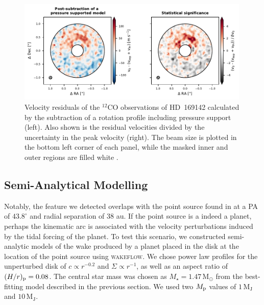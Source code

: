 \begin{figure}
    \centering
    \includegraphics[width = 0.99\textwidth]{figures/garg_arc.pdf}
    \caption{Velocity residuals of the $^{12}$CO observations of HD~169142 calculated by the subtraction of a rotation profile including pressure support (left). Also shown is the residual velocities divided by the uncertainty in the peak velocity (right). The beam size is plotted in the bottom left corner of each panel, while the masked inner and outer regions are filled white \citep{garg2022}.}
    \label{fig:garg_arc}
\end{figure}

\subsection{Semi-Analytical Modelling}

Notably, the feature we detected overlaps with the point source found in \citet{gratton2019} at a PA of $43.8^\circ$ and radial separation of $38$ au.
If the point source is a indeed a planet, perhaps the kinematic arc is associated with the velocity perturbations induced by the tidal forcing of the planet.
To test this scenario, we constructed semi-analytic models of the wake produced by a planet placed in the disk at the location of the \citet{gratton2019} point source using \textsc{wakeflow}.
We chose power law profiles for the unperturbed disk of $c \propto r^{-0.2}$ and $\Sigma \propto r^{-1}$, as well as an aspect ratio of $(H/r)_{\rm p}=0.08$.
The central star mass was chosen as $M_\star = 1.47 \, \mathrm{M_\odot}$ from the best-fitting model described in the previous section.
We used two $M_{\rm p}$ values of $1 \, \mathrm{M_J}$ and $10 \, \mathrm{M_J}$.

